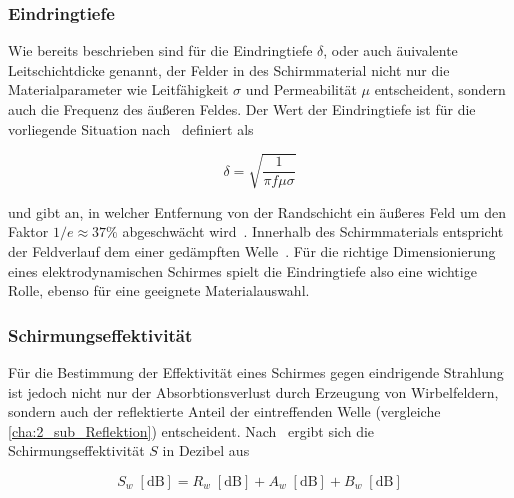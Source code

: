 \subsubsection{Eindringtiefe}\label{cha:2_subsub_Eindringtiefe}

Wie bereits beschrieben sind für die Eindringtiefe $\delta$, oder auch äuivalente Leitschichtdicke genannt, der Felder in des Schirmmaterial nicht nur die Materialparameter wie Leitfähigkeit $\sigma$ und Permeabilität $\mu$ entscheident, sondern auch die Frequenz des äußeren Feldes. Der Wert der Eindringtiefe ist für die vorliegende Situation nach~\cite{Taschenbuch_HF-Technik} definiert als

\begin{equation}
    \delta = \sqrt{\frac{1}{\pi f \mu \sigma}}
    \label{eq:2_Eindringtiefe}
\end{equation}

und gibt an, in welcher Entfernung von der Randschicht ein äußeres Feld um den Faktor $1/e \approx 37 \si{\percent}$ abgeschwächt wird~\cite{Taschenbuch_HF-Technik}. Innerhalb des Schirmmaterials entspricht der Feldverlauf dem einer gedämpften Welle~\cite{EM_Schirmung}. Für die richtige Dimensionierung eines elektrodynamischen Schirmes spielt die Eindringtiefe also eine wichtige Rolle, ebenso für eine geeignete Materialauswahl.


\subsubsection{Schirmungseffektivität}\label{cha:2_subsub_Schirmungseffektivitaet}

Für die Bestimmung der Effektivität eines Schirmes gegen eindrigende Strahlung ist jedoch nicht nur der Absorbtionsverlust durch Erzeugung von Wirbelfeldern, sondern auch der reflektierte Anteil der eintreffenden Welle (vergleiche \Abschnitt\ref{cha:2_sub_Reflektion}) entscheident. Nach~\cite{Problems_in_shielding_electronic_equiptment, NASA_SP-3067} ergibt sich die Schirmungseffektivität $S$ in Dezibel aus

\begin{equation}
    S_w \; \left[\text{dB}\right] = R_w \; \left[\text{dB}\right] + A_w \; \left[\text{dB}\right] + B_w \; \left[\text{dB}\right]
    \label{eq:2_Schirmungseffektivitaet}
\end{equation}

